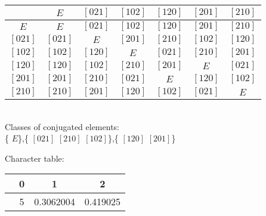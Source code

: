 \documentclass[12pt]{report}
\begin{document}
 
 
\newcommand{\rr}{\boldsymbol{r}} 
\newcommand{\kk}{\boldsymbol{k}} 
\newcommand{\RR}{\boldsymbol{R}} 
\newcommand{\fsp}{\mbox{ }} 
\renewcommand{\le}{\leqslant} 
\renewcommand{\ge}{\geqslant} 
\newcommand{\ds}{\displaystyle} 
\newcommand{\eps}{\varepsilon} 
\newcommand{\fmbr}{\begin{array}{c}} 
\newcommand{\fm}{\end{array}} 
\newcommand{\ra}{{\rightarrow}} 
\newcommand{\eq}{\begin{equation}} 
\newcommand{\eeq}{\end{equation}} 
\newcommand{\arsh}{\mathop{\rm arsh}\nolimits} 
 

\begin{tabular}{c | c c c c c c } 
& $E$& $[021]$& $[102]$& $[120]$& $[201]$& $[210]$\\ 
 \hline 
 $E$& $E$& $[021]$& $[102]$& $[120]$& $[201]$& $[210]$\\
$[021]$& $[021]$& $E$& $[201]$& $[210]$& $[102]$& $[120]$\\
$[102]$& $[102]$& $[120]$& $E$& $[021]$& $[210]$& $[201]$\\
$[120]$& $[120]$& $[102]$& $[210]$& $[201]$& $E$& $[021]$\\
$[201]$& $[201]$& $[210]$& $[021]$& $E$& $[120]$& $[102]$\\
$[210]$& $[210]$& $[201]$& $[120]$& $[102]$& $[021]$& $E$\\
\end{tabular}

\\
Classes of conjugated elements:
\\
\{ $E$\},\{ $[021]$ $[210]$ $[102]$\},\{ $[120]$ $[201]$\}

Character table:


\begin{tabular}{c | c c c } 
& 0& 1& 2\\ 
 \hline 
 & 5& 0.3062004& 0.419025\\
\end{tabular}
\end{document}
